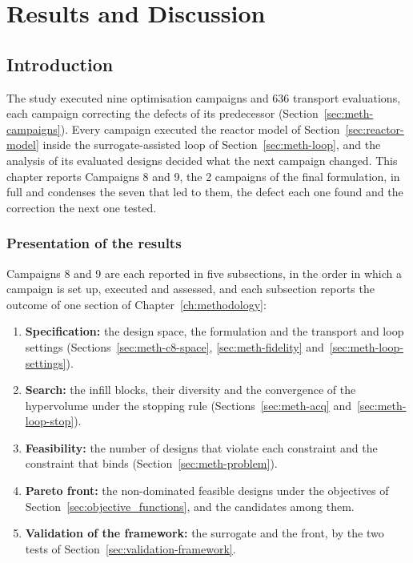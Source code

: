 
\providecommand{\openpoint}[1]{\par\noindent\fbox{\parbox{0.97\linewidth}{%
  \textbf{Open point:} #1}}\par}

\setcounter{secnumdepth}{3}

\chapter{Results and Discussion}
\label{ch:results}

\section{Introduction}
\label{sec:res-intro}

The study executed nine optimisation campaigns and 636 transport
evaluations, each campaign correcting the defects of its predecessor
(Section~\ref{sec:meth-campaigns}). Every campaign executed the reactor model
of Section~\ref{sec:reactor-model} inside the surrogate-assisted loop
of Section~\ref{sec:meth-loop}, and the analysis of its evaluated designs decided what the next campaign changed. This chapter reports Campaigns 8 and 9,
the 2 campaigns of the final formulation, in full and condenses the
seven that led to them, the defect each one found and the correction the next one
tested.

\subsection{Presentation of the results}
\label{sec:res-presentation}

Campaigns 8 and 9 are each reported in five subsections, in the order
in which a campaign is set up, executed and assessed, and each subsection
reports the outcome of one section of Chapter~\ref{ch:methodology}:

\begin{enumerate}
  \item \textbf{Specification:} the design space, the formulation and
        the transport and loop settings
        (Sections~\ref{sec:meth-c8-space}, \ref{sec:meth-fidelity}
        and~\ref{sec:meth-loop-settings}).

  \item \textbf{Search:} the infill blocks, their diversity and the
        convergence of the hypervolume under the stopping rule
        (Sections~\ref{sec:meth-acq} and~\ref{sec:meth-loop-stop}).

  \item \textbf{Feasibility:} the number of designs that violate each
        constraint and the constraint that binds
        (Section~\ref{sec:meth-problem}).

  \item \textbf{Pareto front:} the non-dominated feasible designs under
        the objectives of Section~\ref{sec:objective_functions}, and
        the candidates among them.

  \item \textbf{Validation of the framework:} the surrogate and the
        front, by the two tests of
        Section~\ref{sec:validation-framework}.
\end{enumerate}

